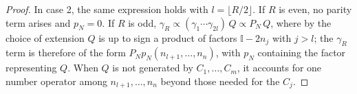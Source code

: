 \documentclass[%
 aip,
 amsmath,amssymb,
 reprint,%
]{revtex4-1}
\newtheorem{statement}{Statement}
\newcommand{\Id}{\mathbb{I}}       %
\newcommand{\kLinIndepAnti}{R}           %
\begin{document}
\begin{proof}
\indent In case 2, {the same expression holds with $l = \lfloor \kLinIndepAnti/2 \rfloor$. If $\kLinIndepAnti$ is even, no parity term arises and $p_N = 0$. If $\kLinIndepAnti$ is odd, $\gamma_{\kLinIndepAnti} \propto (\gamma_1 \cdots \gamma_{2l})\, Q \propto P_N\, Q$, where by the choice of extension $Q$ is up to sign a product of factors $\Id - 2n_j$ with $j > l$; the $\gamma_{\kLinIndepAnti}$ term is therefore of the form $P_N p_N(n_{l+1}, \dots, n_n)$, with $p_N$ containing the factor representing $Q$. When $Q$ is not generated by $C_1, \dots, C_m$, it accounts for one number operator among $n_{l+1}, \dots, n_n$ beyond those needed for the $C_j$.}

\end{proof}

\end{document}
